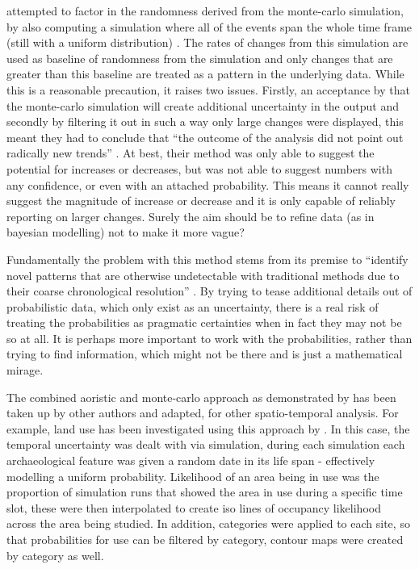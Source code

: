  \citet{Crema2012} attempted to factor in the randomness derived from the monte-carlo simulation, by also computing a simulation where all of the events span the whole time frame (still with a uniform distribution) \citep[452]{Crema2012}. The rates of changes from this simulation are used as baseline of randomness from the simulation and only changes that are greater than this baseline are treated as a pattern in the underlying data. While this is a reasonable precaution, it raises two issues. Firstly, an acceptance by \citet{Crema2012} that the monte-carlo simulation will create additional uncertainty in the output and secondly by filtering it out in such a way only large changes were displayed, this meant they had to conclude that ``the outcome of the analysis did not point out radically new trends'' \citep[458]{Crema2012}. At best, their method was only able to suggest the potential for increases or decreases, but was not able to suggest numbers with any confidence, or even with an attached probability. This means it cannot really suggest the magnitude of increase or decrease and it is only capable of reliably reporting on larger changes. Surely the aim should be to refine data (as in bayesian modelling) not to make it more vague?

Fundamentally the problem with this method stems from its premise to ``identify novel patterns that are otherwise undetectable with traditional methods due to their coarse chronological resolution'' \citep[1125]{Crema20101118}. By trying to tease additional details out of probabilistic data, which only exist as an uncertainty, there is a real risk of treating the probabilities as pragmatic certainties when in fact they may not be so at all. It is perhaps more important to work with the probabilities, rather than trying to find information, which might not be there and is just a mathematical mirage.

The combined aoristic and monte-carlo approach as demonstrated by \citet{Crema20101118,Crema2012} has been taken up by other authors and adapted, for other spatio-temporal analysis. For example, land use has been investigated using this approach by \citet{ARCM:ARCM12182}. In this case, the temporal uncertainty was dealt with via simulation, during each simulation each archaeological feature was given a random date in its life span \citet[6]{ARCM:ARCM12182} - effectively modelling a uniform probability. Likelihood of an area being in use was the proportion of simulation runs that showed the area in use during a specific time slot, these were then interpolated to create iso lines of occupancy likelihood across the area being studied. In addition, categories were applied to each site, so that probabilities for use can be filtered by category, contour maps were created by category as well.

